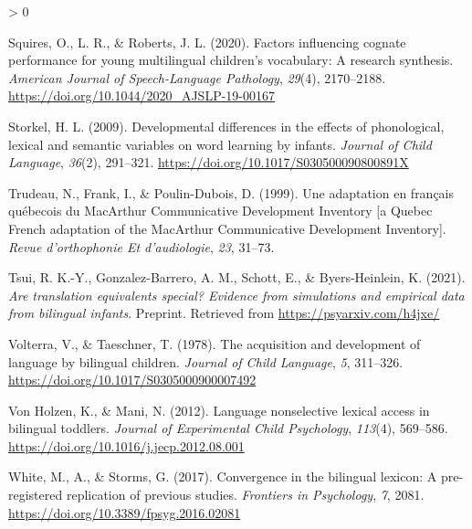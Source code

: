 \documentclass[
  english,
  ,man,floatsintext]{apa6}
\newlength{\cslhangindent}
\newenvironment{CSLReferences}[2] %
 {%
  \setlength{\parindent}{0pt}
  \ifodd #1 \everypar{\setlength{\hangindent}{\cslhangindent}}\ignorespaces\fi
  \ifnum #2 > 0
  \setlength{\parskip}{#2\baselineskip}
  \fi
 }%
 {}
\begin{document}
\begin{CSLReferences}{1}{0}
\leavevmode\hypertarget{ref-Squirres_etal_2020}{}%
Squires, O., L. R., \& Roberts, J. L. (2020). Factors influencing cognate performance for young multilingual children's vocabulary: A research synthesis. \emph{American Journal of Speech-Language Pathology}, \emph{29}(4), 2170--2188. \url{https://doi.org/10.1044/2020_AJSLP-19-00167}

\leavevmode\hypertarget{ref-Storkel_2009}{}%
Storkel, H. L. (2009). Developmental differences in the effects of phonological, lexical and semantic variables on word learning by infants. \emph{Journal of Child Language}, \emph{36}(2), 291--321. \url{https://doi.org/10.1017/S030500090800891X}

\leavevmode\hypertarget{ref-Trudeau_etal_1999}{}%
Trudeau, N., Frank, I., \& Poulin-Dubois, D. (1999). Une adaptation en français québecois du MacArthur {C}ommunicative {D}evelopment {I}nventory {[}a {Q}uebec {F}rench adaptation of the MacArthur {C}ommunicative {D}evelopment {I}nventory{]}. \emph{Revue d'orthophonie Et d'audiologie}, \emph{23}, 31--73.

\leavevmode\hypertarget{ref-Tsui_etal_2021}{}%
Tsui, R. K.-Y., Gonzalez-Barrero, A. M., Schott, E., \& Byers-Heinlein, K. (2021). \emph{Are translation equivalents special? Evidence from simulations and empirical data from bilingual infants}. Preprint. Retrieved from \url{https://psyarxiv.com/h4jxe/}

\leavevmode\hypertarget{ref-Volterra_Taeschner_1978}{}%
Volterra, V., \& Taeschner, T. (1978). The acquisition and development of language by bilingual children. \emph{Journal of Child Language}, \emph{5}, 311--326. \url{https://doi.org/10.1017/S0305000900007492}

\leavevmode\hypertarget{ref-VonHolzen_Mani_2012}{}%
Von Holzen, K., \& Mani, N. (2012). Language nonselective lexical access in bilingual toddlers. \emph{Journal of Experimental Child Psychology}, \emph{113}(4), 569--586. \url{https://doi.org/10.1016/j.jecp.2012.08.001}

\leavevmode\hypertarget{ref-White_etal_2017}{}%
White, M., A., \& Storms, G. (2017). Convergence in the bilingual lexicon: A pre-registered replication of previous studies. \emph{Frontiers in Psychology}, \emph{7}, 2081. \url{https://doi.org/10.3389/fpsyg.2016.02081}

\end{CSLReferences}

\endgroup
\end{document}
